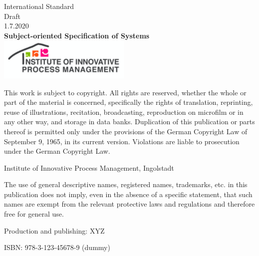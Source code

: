 \documentclass[11pt, showtrims, final, oldfontcommands]{memoir}
\begin{document}
	
	
	\pagestyle{empty}
	
	\vspace*{0cm}
	\begin{adjustwidth}{3cm}{-3cm}
		\begin{flushright}
			\HUGE\textsf{International Standard}
			\vspace*{3cm}\\
			\large\textsf{Draft\\1.7.2020}
			\vspace*{3cm}\\
			\LARGE\textsf{\textbf{Subject-oriented Specification of Systems}}
			\vfill
			\includegraphics[height=2cm]{figures/i2pm.pdf}
		\end{flushright}
	\end{adjustwidth}
	\clearpage
	
	\vspace*{\fill}
	\footnotesize
	
	This work is subject to copyright. All rights are reserved, whether the whole or part of the material is concerned, specifically the rights of translation, reprinting, reuse of illustrations, recitation, broadcasting, reproduction on microfilm or in any other way, and storage in data banks. Duplication of this publication or parts thereof is permitted only under the provisions of the German Copyright Law of September 9, 1965, in its current version. Violations are liable to prosecution under the German Copyright Law.
	
	 Institute of Innovative Process Management, Ingolstadt
	
	The use of general descriptive names, registered names, trademarks, etc. in this publication does not imply, even in the absence of a specific statement, that such names are exempt from the relevant protective laws and regulations and therefore free for general use.
	
	Production and publishing: XYZ
	
	ISBN: 978-3-123-45678-9 (dummy)
	\normalsize
	\clearpage
	
\end{document}
